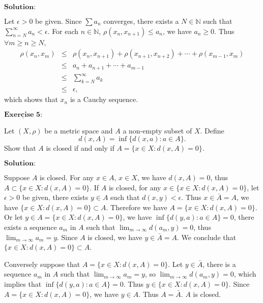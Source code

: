 \documentclass[12pt,a4paper]{ctexart}
\begin{document}
\vspace{8pt}
$\textbf{Solution:}$

Let $\epsilon > 0$ be given. Since $\sum a_n$ converges, there exists a $N \in \mathbb N$ such that $\sum_{n = N}^{\infty} a_n < \epsilon$. For each $n \in \mathbb N$, $\rho(x_n, x_{n+1}) \leq a_n$, we have $a_n \geq 0$. Thus $\forall m \geq n \geq N$,
\begin{eqnarray*}
    \rho(x_n, x_m) & \leq & \rho(x_n, x_{n+1}) + \rho(x_{n+1}, x_{n+2}) + \cdots + \rho(x_{m-1}, x_{m})  \\
    & \leq & a_n + a_{n+1} + \cdots + a_{m-1}  \\
    & \leq &  \sum_{k = N}^{\infty} a_k  \\
    & \leq & \epsilon,
\end{eqnarray*}
which shows that $x_n$ is a Cauchy sequence.


\newpage

$\underline{\textbf{Exercise 5:}}$

Let $(X, \rho)$ be a metric space and $A$ a non-empty subset of $X$. Define 
$$d(x, A) = \inf \{d(x, a) : a \in A \}.$$
Show that $A$ is closed if and only if $A = \{x \in X: d(x, A) = 0 \}$.

\vspace{8pt}
$\textbf{Solution:}$

Suppose $A$ is closed. For any $x \in A$, $x \in X$, we have $d(x, A) = 0$, thus $A \subset \{x \in X: d(x, A) = 0 \}$. If $A$  is closed, for any $x \in \{x \in X: d(x, A) = 0 \}$, let $\epsilon > 0$ be given, there exists $y \in A$ such that $d(x, y) < \epsilon$. Thus $x \in \bar{A} = A$, we have $\{x \in X: d(x, A) = 0 \} \subset A$. Therefore we have $A = \{x \in X: d(x, A) = 0 \}$. Or let $y \in A = \{x \in X: d(x, A) = 0 \}$, we have $\inf \{d(y, a) : a \in A \} = 0$, there exists a sequence $a_m$ in $A$ such that $\lim_{m \to \infty} d(a_m, y) = 0$, thus $\lim_{m \to \infty} a_m = y$. Since $A$ is closed, we have $y \in \bar{A} = A$. We conclude that $\{x \in X: d(x, A) = 0 \} \subset A$.

Conversely suppose that $A = \{x \in X: d(x, A) = 0 \}$. Let $y \in \bar{A}$, there is a sequence $a_m$ in $A$ such that $\lim_{m \to \infty} a_m = y$, so $\lim_{m \to \infty} d(a_m, y) = 0$, which implies that $\inf \{d(y, a) : a \in A \} = 0$. Thus $y \in \{x \in X: d(x, A) = 0 \}$. Since $A = \{x \in X: d(x, A) = 0 \}$, we have $y \in A$. Thus $A = \bar{A}$. $A$ is closed.


\newpage
\end{document}
